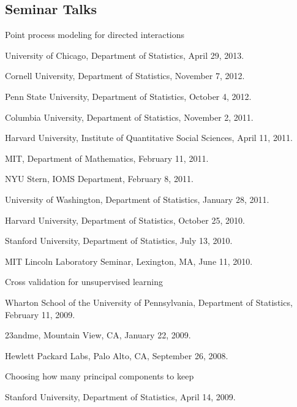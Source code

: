 \documentclass[10pt,letterpaper]{article}
\renewenvironment{itemize}{
  \begin{list}{}{
    \setlength{\leftmargin}{1.5em}
    \setlength{\itemsep}{0.25em}
    \setlength{\parskip}{0pt}
    \setlength{\parsep}{0.25em}
  }
}{
  \end{list}
}
\begin{document}
\subsection*{Seminar Talks}

\begin{itemize}

\item Point process modeling for directed interactions
  \begin{itemize}
  \item University of Chicago, Department of Statistics, April 29, 2013.
  \item Cornell University, Department of Statistics, November 7, 2012.
  \item Penn State University, Department of Statistics, October 4, 2012.
  \item Columbia University, Department of Statistics, November 2, 2011.
  \item Harvard University, Institute of Quantitative Social Sciences, April 11, 2011.
  \item MIT, Department of Mathematics, February 11, 2011.
  \item NYU Stern, IOMS Department, February 8, 2011.
  \item University of Washington, Department of Statistics, January 28, 2011.
  \item %
    Harvard University, Department of Statistics, October 25, 2010.
  \item %
    Stanford University, Department of Statistics, July 13, 2010.
  \item %
    MIT Lincoln Laboratory Seminar, Lexington, MA, June 11, 2010.
  \end{itemize}


\item Cross validation for unsupervised learning
  \begin{itemize}
    \item Wharton School of the University of Pennsylvania, Department of Statistics,
      February 11, 2009. 
    \item 23andme, Mountain View, CA, January 22, 2009.
    \item Hewlett Packard Labs, Palo Alto, CA, September 26, 2008.
  \end{itemize}

\item Choosing how many principal components to keep
  \begin{itemize}
    \item Stanford University, Department of Statistics, April 14, 2009.
  \end{itemize}

\end{itemize}
\end{document}
